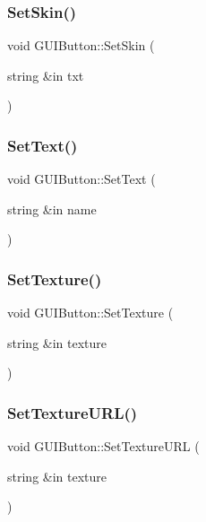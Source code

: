 \subsubsection{\texorpdfstring{Set\+Skin()}{SetSkin()}}
{\footnotesize\ttfamily void G\+U\+I\+Button\+::\+Set\+Skin (\begin{DoxyParamCaption}\item[{string \&in}]{txt }\end{DoxyParamCaption})}

\hypertarget{class_g_u_i_button_ae5f54b7985c740e0538f930d89abe7d1}{}\label{class_g_u_i_button_ae5f54b7985c740e0538f930d89abe7d1} 
\subsubsection{\texorpdfstring{Set\+Text()}{SetText()}}
{\footnotesize\ttfamily void G\+U\+I\+Button\+::\+Set\+Text (\begin{DoxyParamCaption}\item[{string \&in}]{name }\end{DoxyParamCaption})}

\hypertarget{class_g_u_i_button_ae1f76581fdab67e52dbecde264b68b4c}{}\label{class_g_u_i_button_ae1f76581fdab67e52dbecde264b68b4c} 
\subsubsection{\texorpdfstring{Set\+Texture()}{SetTexture()}}
{\footnotesize\ttfamily void G\+U\+I\+Button\+::\+Set\+Texture (\begin{DoxyParamCaption}\item[{string \&in}]{texture }\end{DoxyParamCaption})}

\hypertarget{class_g_u_i_button_a5fd6a68006195bc100908780dfd54e93}{}\label{class_g_u_i_button_a5fd6a68006195bc100908780dfd54e93} 
\subsubsection{\texorpdfstring{Set\+Texture\+U\+R\+L()}{SetTextureURL()}}
{\footnotesize\ttfamily void G\+U\+I\+Button\+::\+Set\+Texture\+U\+RL (\begin{DoxyParamCaption}\item[{string \&in}]{texture }\end{DoxyParamCaption})}

